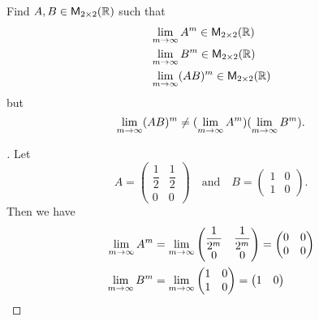 \begin{ex}\label{ex:5.3.5}
  Find \(A, B \in \ms[2][2][\R]\) such that
  \begin{align*}
     & \Lim_{m \to \infty} A^m \in \ms[2][2][\R]    \\
     & \Lim_{m \to \infty} B^m \in \ms[2][2][\R]    \\
     & \Lim_{m \to \infty} (AB)^m \in \ms[2][2][\R]
  \end{align*}
  but
  \[
    \lim\limits_{m \to \infty} (AB)^m \neq (\lim\limits_{m \to \infty} A^m) (\lim\limits_{m \to \infty} B^m).
  \]
\end{ex}

\begin{proof}[]
  Let
  \[
    A = \begin{pmatrix}
      \dfrac{1}{2} & \dfrac{1}{2} \\
      0            & 0
    \end{pmatrix} \quad \text{and} \quad B = \begin{pmatrix}
      1 & 0 \\
      1 & 0
    \end{pmatrix}.
  \]
  Then we have
  \begin{align*}
    \lim\limits_{m \to \infty} A^m    & = \lim\limits_{m \to \infty} \begin{pmatrix}
                                                         \dfrac{1}{2^m} & \dfrac{1}{2^m} \\
                                                         0              & 0
                                                       \end{pmatrix} = \begin{pmatrix}
                                                                         0 & 0 \\
                                                                         0 & 0
                                                                       \end{pmatrix} \\
    \lim\limits_{m \to \infty} B^m    & = \lim\limits_{m \to \infty} \begin{pmatrix}
                                                         1 & 0 \\
                                                         1 & 0
                                                       \end{pmatrix} = \begin{pmatrix}
                                                                         1 & 0 \\

\end{pmatrix}
\end{align*}
\end{proof}
